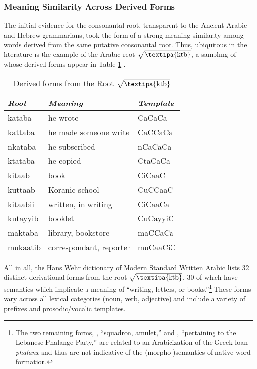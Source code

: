 \documentclass[12pt,twoside,letterpaper]{article}
\begin{document}
\subsubsection{Meaning Similarity Across Derived Forms}
\label{sec:mean-simil-across}

The initial evidence for the consonantal root, transparent to the Ancient Arabic and Hebrew grammarians, took the form of a strong meaning similarity among words derived from the same putative consonantal root. Thus, ubiquitous in the literature is the example of the Arabic root $\sqrt{\textrm{\textipa{ktb}}}$, a sampling of whose derived forms appear in Table \ref{tab:ktb} \citep{wehr76}.

\begin{table}[ht]
  \centering
  \begin{tabular}[ht]{lll}
    \hline
    \emph{Root}&\emph{Meaning}&\emph{Template}\\
    \hline
    kataba&he wrote&CaCaCa\\
    kattaba&he made someone write&CaCCaCa\\
    nkataba&he subscribed&nCaCaCa\\
    ktataba&he copied&CtaCaCa\\
    kitaab&book&CiCaaC\\
    kuttaab&Koranic school&CuCCaaC\\
    kitaabii&written, in writing&CiCaaCa\\
    kutayyib&booklet&CuCayyiC\\
    maktaba&library, bookstore&maCCaCa\\
    mukaatib&correspondant, reporter&muCaaCiC\\
    \hline
  \end{tabular}
  \caption{Derived forms from the Root $\sqrt{\textrm{\textipa{ktb}}}$}
  \label{tab:ktb}
\end{table}

All in all, the Hans Wehr dictionary of Modern Standard Written Arabic \citep{wehr76} lists 32 distinct derivational forms from the root $\sqrt{\textrm{\textipa{ktb}}}$, 30 of which have semantics which implicate a meaning of ``writing, letters, or books.''\footnote{The two remaining forms, {\em {}}, ``squadron, amulet,'' and {\em{}}, ``pertaining to the Lebanese Phalange Party,'' are related to an Arabicization of the Greek loan {\em phalanx} and thus are not indicative of the (morpho-)semantics of native word formation.} These forms vary across all lexical categories (noun, verb, adjective) and include a variety of prefixes and prosodic/vocalic templates. 
\end{document}

